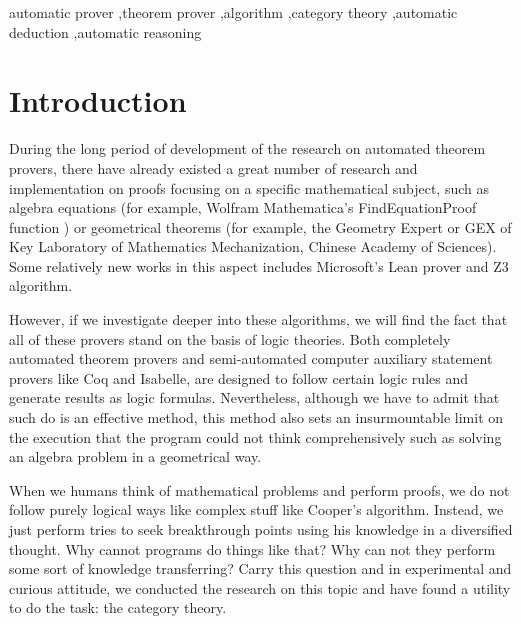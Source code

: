 \documentclass{aims}
\numberwithin{theorem}{section}	%
\numberwithin{axiom}{section}	%
\numberwithin{definition}{section}	%
\begin{document}
\begin{frontmatter}
\begin{graphicalabstract}
\begin{figure}[h]
		\end{figure}
	\end{graphicalabstract}
	
	\begin{keyword}
		automatic prover \sep theorem prover \sep algorithm \sep category theory \sep automatic deduction \sep automatic reasoning
	\end{keyword}
\end{frontmatter}

\section{Introduction}
During the long period of development of the research on automated theorem provers, there have already existed a great number of research and implementation on proofs focusing on a specific mathematical subject, such as algebra equations (for example, Wolfram Mathematica{'}s FindEquationProof function \cite{Wolfram2019}) or geometrical theorems (for example, the Geometry Expert or GEX \cite{Gao1998} of Key Laboratory of Mathematics Mechanization, Chinese Academy of Sciences). Some relatively new works in this aspect includes Microsoft{'}s Lean prover \cite{Moura2021} and Z3 \cite{Moura2008} algorithm.

However, if we investigate deeper into these algorithms, we will find the fact that all of these provers stand on the basis of logic theories. Both completely automated theorem provers and semi-automated computer auxiliary statement provers like Coq and Isabelle, are designed to follow certain logic rules and generate results as logic formulas. Nevertheless, although we have to admit that such do is an effective method, this method also sets an insurmountable limit on the execution that the program could not think comprehensively such as solving an algebra problem in a geometrical way.

When we humans think of mathematical problems and perform proofs, we do not follow purely logical ways like complex stuff like Cooper{'}s algorithm. Instead, we just perform tries to seek breakthrough points using his knowledge in a diversified thought. Why cannot programs do things like that? Why can not they perform some sort of knowledge transferring? Carry this question and in experimental and curious attitude, we conducted the research on this topic and have found a utility to do the task: the category theory.
\end{document}
